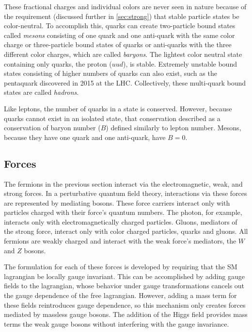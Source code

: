 These fractional charges and individual colors are never seen in nature because of the requirement (discussed further in \autoref{sec:strong}) that stable particle states be color-neutral. To accomplish this, quarks can create two-particle bound states called \textit{mesons} consisting of one quark and one anti-quark with the same color charge or three-particle bound states of quarks or anti-quarks with the three different color charges, which are called \textit{baryons}. The lightest color neutral state containing only quarks, the proton ($uud$), is stable. Extremely unstable bound states consisting of higher numbers of quarks can also exist, such as the pentaquark discovered in 2015 at the \ac{LHC}. \cite{Pentaquark} Collectively, these multi-quark bound states are called \textit{hadrons}. 

Like leptons, the number of quarks in a state is conserved. However, because quarks cannot exist in an isolated state, that conservation described as a conservation of baryon number ($B$) defined similarly to lepton number. Mesons, because they have one quark and one anti-quark, have $B = 0$. 

\subsection{Forces}

The fermions in the previous section interact via the electromagnetic, weak, and strong forces. In a perturbative quantum field theory, interactions via these forces are represented by mediating bosons. These force carriers interact only with particles charged with their  force's quantum numbers. The photon, for example, interacts only with electromagnetically charged particles. Gluons, mediators of the strong force, interact only with color charged particles, quarks and gluons. All fermions are weakly charged and interact with the weak force's mediators, the $W$ and $Z$ bosons. 

The formulation for each of these forces is developed by requiring that the \ac{SM} lagrangian be locally gauge invariant. \cite{Griffiths:111880} This can be accomplished by adding gauge fields to the lagrangian, whose behavior under gauge transformations cancels out the gauge dependence of the free lagrangian. However, adding a mass term for these fields reintroduces gauge dependence, so this mechanism only creates forces mediated by massless gauge bosons. The addition of the Higgs field provides mass terms the weak gauge bosons without interfering with the gauge invariance. 

